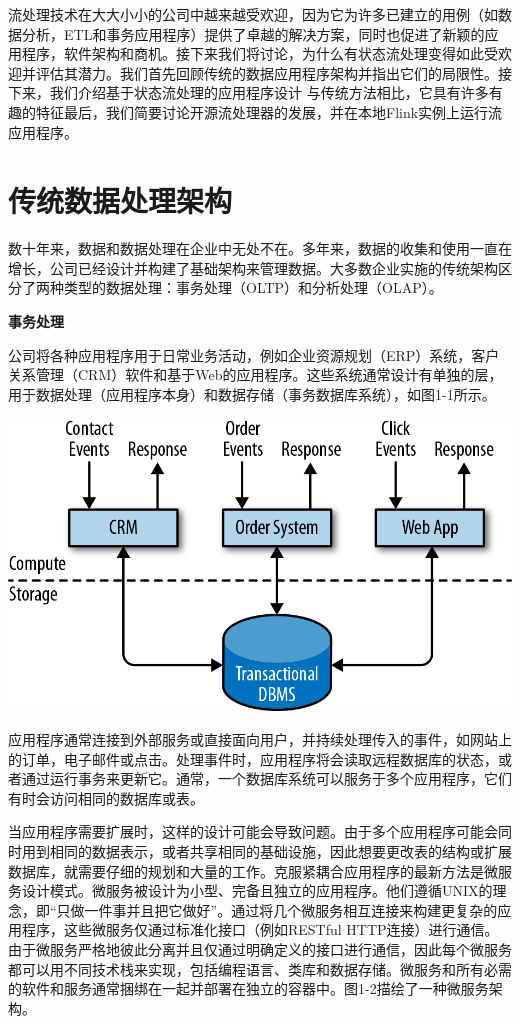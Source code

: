 \documentclass[oneside]{ctexbook}
\begin{document}
流处理技术在大大小小的公司中越来越受欢迎，因为它为许多已建立的用例（如数据分析，ETL和事务应用程序）提供了卓越的解决方案，同时也促进了新颖的应用程序，软件架构和商机。接下来我们将讨论，为什么有状态流处理变得如此受欢迎并评估其潜力。我们首先回顾传统的数据应用程序架构并指出它们的局限性。接下来，我们介绍基于状态流处理的应用程序设计 与传统方法相比，它具有许多有趣的特征最后，我们简要讨论开源流处理器的发展，并在本地Flink实例上运行流应用程序。

\section{传统数据处理架构}

数十年来，数据和数据处理在企业中无处不在。多年来，数据的收集和使用一直在增长，公司已经设计并构建了基础架构来管理数据。大多数企业实施的传统架构区分了两种类型的数据处理：事务处理（OLTP）和分析处理（OLAP）。

\textbf{事务处理}

公司将各种应用程序用于日常业务活动，例如企业资源规划（ERP）系统，客户关系管理（CRM）软件和基于Web的应用程序。这些系统通常设计有单独的层，用于数据处理（应用程序本身）和数据存储（事务数据库系统），如图1-1所示。

\noindent\includegraphics[width=\textwidth]{images/spaf_0101.png}

应用程序通常连接到外部服务或直接面向用户，并持续处理传入的事件，如网站上的订单，电子邮件或点击。处理事件时，应用程序将会读取远程数据库的状态，或者通过运行事务来更新它。通常，一个数据库系统可以服务于多个应用程序，它们有时会访问相同的数据库或表。

当应用程序需要扩展时，这样的设计可能会导致问题。由于多个应用程序可能会同时用到相同的数据表示，或者共享相同的基础设施，因此想要更改表的结构或扩展数据库，就需要仔细的规划和大量的工作。克服紧耦合应用程序的最新方法是微服务设计模式。微服务被设计为小型、完备且独立的应用程序。他们遵循UNIX的理念，即“只做一件事并且把它做好”。通过将几个微服务相互连接来构建更复杂的应用程序，这些微服务仅通过标准化接口（例如RESTful HTTP连接）进行通信。由于微服务严格地彼此分离并且仅通过明确定义的接口进行通信，因此每个微服务都可以用不同技术栈来实现，包括编程语言、类库和数据存储。微服务和所有必需的软件和服务通常捆绑在一起并部署在独立的容器中。图1-2描绘了一种微服务架构。
\end{document}
